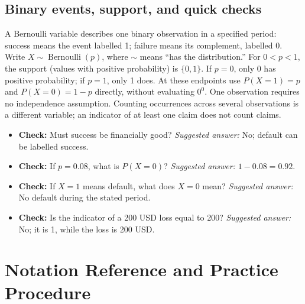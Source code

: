 \subsection{Binary events, support, and quick checks}
A Bernoulli variable describes one binary observation in a specified period:
success means the event labelled 1; failure means its complement, labelled 0.
Write $X\sim\operatorname{Bernoulli}(p)$, where $\sim$ means ``has the distribution.''
For $0<p<1$, the support (values with positive probability) is $\{0,1\}$.
If $p=0$, only 0 has positive probability; if $p=1$, only 1 does.
At these endpoints use $P(X=1)=p$ and $P(X=0)=1-p$ directly, without evaluating $0^0$.
One observation requires no independence assumption. Counting occurrences across several
observations is a different variable; an indicator of at least one claim does not count claims.

\begin{itemize}
\item \textbf{Check:} Must success be financially good? \emph{Suggested answer:} No; default can be labelled success.
\item \textbf{Check:} If $p=0.08$, what is $P(X=0)$? \emph{Suggested answer:} $1-0.08=0.92$.
\item \textbf{Check:} If $X=1$ means default, what does $X=0$ mean? \emph{Suggested answer:} No default during the stated period.
\item \textbf{Check:} Is the indicator of a 200 USD loss equal to 200? \emph{Suggested answer:} No; it is 1, while the loss is 200 USD.
\end{itemize}
\secInicio

\clearpage
\section{Notation Reference and Practice Procedure}\label{sec:notation-and-procedure}

